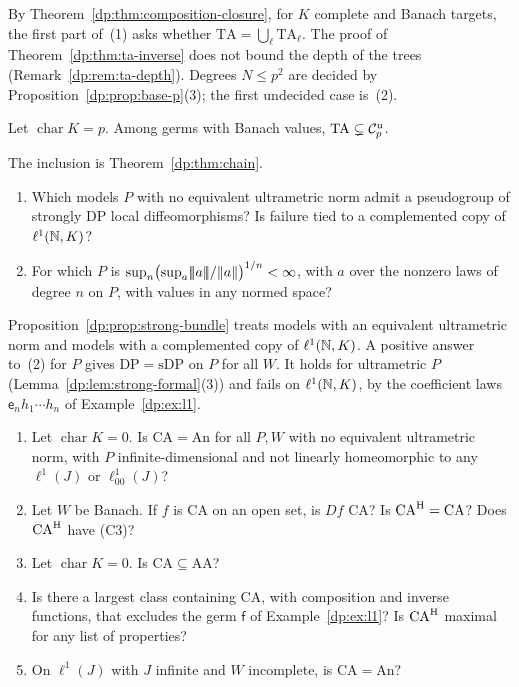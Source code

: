 By Theorem~\ref{dp:thm:composition-closure}, for $K$ complete and Banach targets, the first part of~(1) asks whether $\mathrm{TA}=\bigcup_\ell\mathrm{TA}_\ell$. The proof of Theorem~\ref{dp:thm:ta-inverse} does not bound the depth of the trees (Remark~\ref{dp:rem:ta-depth}). Degrees $N\le p^2$ are decided by Proposition~\ref{dp:prop:base-p}(3); the first undecided case is~(2).

\begin{conjecture}\label{dp:conj:ta}
Let $\operatorname{char}K=p$. Among germs with Banach values, $\mathrm{TA}\subsetneq\mathcal{C}_p^{\rm u}$.
\end{conjecture}

The inclusion is Theorem~\ref{dp:thm:chain}.

\begin{question}\label{dp:q:strong}
\leavevmode
\begin{enumerate}
\item Which models $P$ with no equivalent ultrametric norm admit a pseudogroup of strongly DP local diffeomorphisms? Is failure tied to a complemented copy of $\ell^1(\mathbb N,K)$?
\item For which $P$ is $\sup_n\bigl(\sup_a\lvert\!\lvert\!\lvert a\rvert\!\rvert\!\rvert/\lVert a\rVert\bigr)^{1/n}<\infty$, with $a$ over the nonzero laws of degree $n$ on $P$, with values in any normed space?
\end{enumerate}
\end{question}

Proposition~\ref{dp:prop:strong-bundle} treats models with an equivalent ultrametric norm and models with a complemented copy of $\ell^1(\mathbb N,K)$. A positive answer to~(2) for $P$ gives $\mathrm{DP}=\mathrm{sDP}$ on $P$ for all $W$. It holds for ultrametric $P$ (Lemma~\ref{dp:lem:strong-formal}(3)) and fails on $\ell^1(\mathbb N,K)$, by the coefficient laws $\mathsf e_nh_1\cdots h_n$ of Example~\ref{dp:ex:l1}.

\begin{question}\label{dp:q:cover}
\leavevmode
\begin{enumerate}
\item Let $\operatorname{char}K=0$. Is $\mathrm{CA}=\mathrm{An}$ for all $P,W$ with no equivalent ultrametric norm, with $P$ infinite-dimensional and not linearly homeomorphic to any $\ell^1(J)$ or $\ell^1_{00}(J)$?
\item Let $W$ be Banach. If $f$ is CA on an open set, is $Df$ CA? Is $\mathrm{CA}^{\rm H}=\mathrm{CA}$? Does $\mathrm{CA}^{\rm H}$ have \textup{(C3)}?
\item Let $\operatorname{char}K=0$. Is $\mathrm{CA}\subseteq\mathrm{AA}$?
\item Is there a largest class containing CA, with composition and inverse functions, that excludes the germ $\mathsf f$ of Example~\ref{dp:ex:l1}? Is $\mathrm{CA}^{\rm H}$ maximal for any list of properties?
\item On $\ell^1(J)$ with $J$ infinite and $W$ incomplete, is $\mathrm{CA}=\mathrm{An}$?
\end{enumerate}
\end{question}

